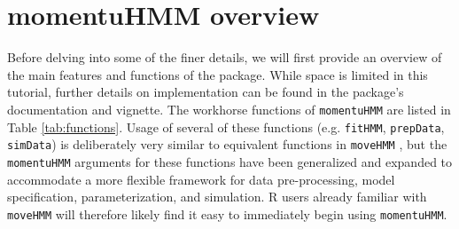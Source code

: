 \documentclass[12pt]{article}\usepackage[]{graphicx}\usepackage[]{color}
\begin{document}
\section{momentuHMM overview}
Before delving into some of the finer details, we will first provide an overview of the main features and functions of the package. While space is limited in this tutorial, further details on implementation can be found in the package's documentation and vignette. The workhorse functions of \verb|momentuHMM| are listed in Table \ref{tab:functions}. Usage of several of these functions (e.g. \verb|fitHMM|, \verb|prepData|, \verb|simData|) is deliberately very similar to equivalent functions in \verb|moveHMM| \citep{MichelotEtAl2016} , but the \verb|momentuHMM| arguments for these functions have been generalized and expanded to accommodate a more flexible framework for data pre-processing, model specification, parameterization, and simulation. R users already familiar with \verb|moveHMM| will therefore likely find it easy to immediately begin using \verb|momentuHMM|. %
\end{document}
